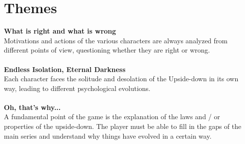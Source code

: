 \section{Themes}
\textbf{What is right and what is wrong}\\
Motivations and actions of the various characters are always analyzed from different points of view, questioning whether they are right or wrong.\\\\
\textbf{Endless Isolation, Eternal Darkness}\\
Each character faces the solitude and desolation of the Upside-down in its own way, leading to different psychological evolutions.\\\\
\textbf{Oh, that's why...}\\
A fundamental point of the game is the explanation of the laws and / or properties of the upside-down. The player must be able to fill in the gaps of the
main series and understand why things have evolved in a certain way.
